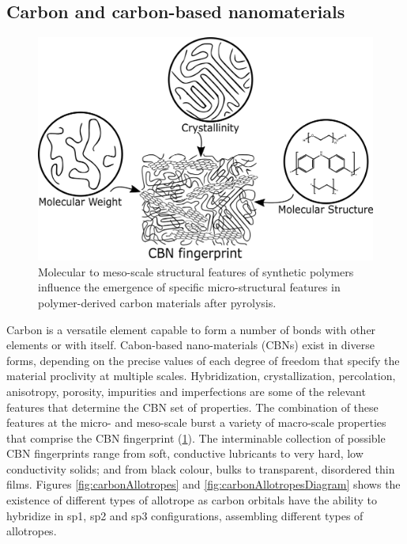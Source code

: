 \subsection{Carbon and carbon-based nanomaterials}

\begin{figure}[th]
\centering
\includegraphics[scale=0.37]{./Figures/CBNfingerprint.png}
\decoRule
\caption[Fingerprint of Carbon-based Nano-materials]{Molecular to meso-scale structural features of synthetic polymers influence the emergence of specific micro-structural features in polymer-derived carbon materials after pyrolysis.}
\label{fig:CBNfingerprint}
\end{figure}

Carbon is a versatile element capable to form a number of bonds with other elements or with itself. Cabon-based nano-materials (CBNs) exist in diverse forms, depending on the precise values of each degree of freedom that specify the material proclivity at multiple scales. Hybridization, crystallization, percolation, anisotropy, porosity, impurities and imperfections are some of the relevant features that determine the CBN set of properties. The combination of these features at the micro- and meso-scale burst a variety of macro-scale properties that comprise the CBN fingerprint (\ref{fig:CBNfingerprint}). The interminable collection of possible CBN fingerprints range from soft, conductive lubricants to very hard, low conductivity solids; and from black colour, bulks to transparent, disordered thin films. \cite{McCreery2008} Figures \ref{fig:carbonAllotropes} and \ref{fig:carbonAllotropesDiagram} shows the existence of different types of allotrope as carbon orbitals have the ability to hybridize in sp1, sp2 and sp3 configurations, assembling different types of allotropes.

